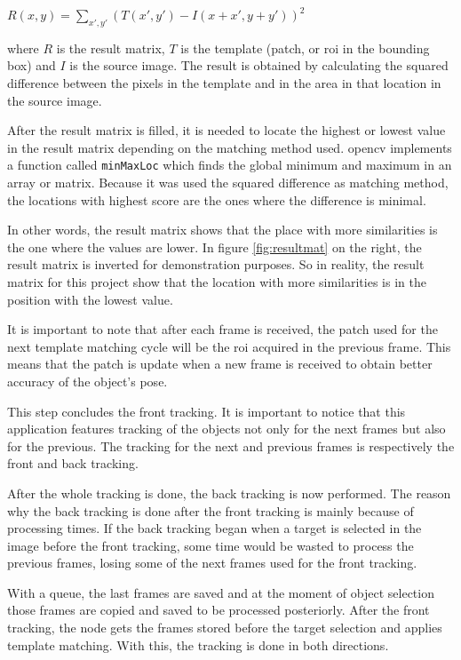 \begin{center}
	$R(x,y) = \sum_{x',y'}(T(x',y')-I(x+x',y+y'))^2$
\end{center}

where $R$ is the result matrix, $T$ is the template (patch, or \gls{roi} in the bounding box) and $I$ is the source image. The result is obtained by calculating the squared difference between the pixels in the template and in the area in that location in the source image.  

After the result matrix is filled, it is needed to locate the highest or lowest value in the result matrix depending on the matching method used. \gls{opencv} implements a function called \texttt{minMaxLoc} which finds the global minimum and maximum in an array or matrix. Because it was used the squared difference as matching method, the locations with highest score are the ones where the difference is minimal.

In other words, the result matrix shows that the place with more similarities is the one where the values are lower. In figure \ref{fig:resultmat} on the right, the result matrix is inverted for demonstration purposes. So in reality, the result matrix for this project show that the location with more similarities is in the position with the lowest value.

It is important to note that after each frame is received, the patch used for the next template matching cycle will be the \gls{roi} acquired in the previous frame. This means that the patch is update when a new frame is received to obtain better accuracy of the object's pose. 

This step concludes the front tracking. It is important to notice that this application features tracking of the objects not only for the next frames but also for the previous. The tracking for the next and previous frames is respectively the front and back tracking.

After the whole tracking is done, the back tracking is now performed. The reason why the back tracking is done after the front tracking is mainly because of processing times. If the back tracking began when a target is selected in the image before the front tracking, some time would be wasted to process the previous frames, losing some of the next frames used for the front tracking. 

With a queue, the last frames are saved and at the moment of object selection those frames are copied and saved to be processed posteriorly. After the front tracking, the node gets the frames stored before the target selection and applies template matching. With this, the tracking is done in both directions.


